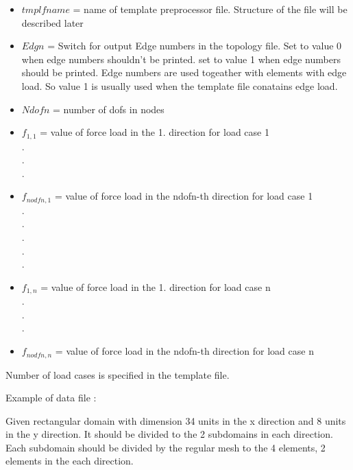 \documentclass[12pt]{book}
\begin{document}
\begin{itemize}
\item $tmplfname$ = name of template preprocessor file. Structure of the file will be described later
\item $Edgn$      = Switch for output Edge numbers in the topology file. Set to value 0 when edge numbers shouldn't be printed.
            set to value 1 when edge numbers should be printed. Edge numbers are used togeather with elements with edge load.
            So value 1 is usually used when the template file conatains edge load.
\item $Ndofn$     = number of dofs in nodes
\item $f_{1,1}$      = value of force load in the 1. direction for load case 1\\
.\\
.\\
.\\
\item $f_{nodfn,1}$  = value of force load in the ndofn-th direction for load case 1\\
.\\
.\\
.\\
.\\
.\\
\item $f_{1,n}$      = value of force load in the 1. direction for load case n\\
.\\
.\\
.\\
\item $f_{nodfn,n}$  = value of force load in the ndofn-th direction for load case n
\end{itemize}
Number of load cases is specified in the template file.

Example of data file :

Given rectangular domain with dimension 34 units in the x direction
and 8 units in the y direction. It should be divided to the 2 subdomains
in each direction. Each subdomain should be divided by the regular mesh to
the 4 elements, 2 elements in the each direction.
\end{document}
